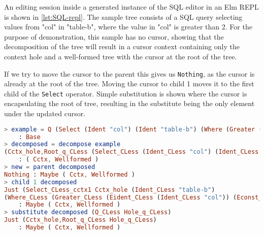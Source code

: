 \documentclass[sigplan,screen]{acmart}
\begin{document}
\begin{example}\label{ex:sql-repl}
An editing session inside a generated instance of the SQL editor in an Elm REPL is
shown in \cref{lst:SQL-repl}.
The sample tree consists of a SQL query
selecting values from "col" in "table-b", where the value in
"col" is greater than 2. For the purpose of demonstration, this sample
has no cursor, showing that the decomposition of the tree will result in a
cursor context containing only the context hole and a well-formed tree
with the cursor at the root of the tree.

If we try to move the cursor to the parent this gives us
\texttt{Nothing}, as the cursor is already at the root of the
tree. Moving the cursor to child 1 moves it to the first child of the
\texttt{Select} operator. Simple substitution is shown where the
cursor is encapsulating the root of tree, resulting in the substitute
being the only element under the updated cursor.

\vspace{2mm}
\begin{minipage}{\linewidth}
\begin{lstlisting}[style=inline, language=elm, caption={SQL editor session in an Elm REPL}, label={lst:SQL-repl}]
> example = Q (Select (Ident "col") (Ident "table-b") (Where (Greater (Eident (Ident "col")) (Econst (Num 2)))))
    : Base
> decomposed = decompose example
(Cctx_hole,Root_q_CLess (Select_CLess (Ident_CLess "col") (Ident_CLess "table-b") (Where_CLess (Greater_CLess (Eident_CLess (Ident_CLess "col")) (Econst_CLess (Num_CLess 2))))))
    : ( Cctx, Wellformed )
> new = parent decomposed
Nothing : Maybe ( Cctx, Wellformed )
> child 1 decomposed
Just (Select_CLess_cctx1 Cctx_hole (Ident_CLess "table-b")
(Where_CLess (Greater_CLess (Eident_CLess (Ident_CLess "col")) (Econst_CLess (Num_CLess 2)))),Root_id_CLess (Ident_CLess "col"))
    : Maybe ( Cctx, Wellformed )
> substitute decomposed (Q_CLess Hole_q_CLess)
Just (Cctx_hole,Root_q_CLess Hole_q_CLess)
    : Maybe ( Cctx, Wellformed )
\end{lstlisting}
\end{minipage}
\vspace{2mm}



\end{example}

\end{document}
